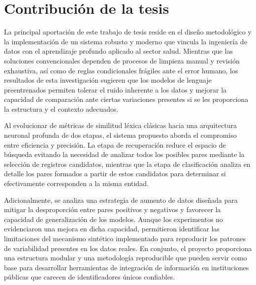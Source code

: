 \section{Contribución de la tesis}

La principal aportación de este trabajo de tesis reside en el diseño metodológico y la implementación de un sistema robusto y moderno que vincula la ingeniería de datos con el aprendizaje profundo aplicado al sector salud. Mientras que las soluciones convencionales dependen de procesos de limpieza manual y revisión exhaustiva, así como de reglas condicionales frágiles ante el error humano, los resultados de esta investigación sugieren que los modelos de lenguaje preentrenados permiten tolerar el ruido inherente a los datos y mejorar la capacidad de comparación ante ciertas variaciones presentes si se les proporciona la estructura y el contexto adecuados.

Al evolucionar de métricas de similitud léxica clásicas hacia una arquitectura neuronal profunda de dos etapas, el sistema propuesto aborda el compromiso entre eficiencia y precisión. La etapa de recuperación reduce el espacio de búsqueda evitando la necesidad de analizar todos los posibles pares mediante la selección de registros candidatos, mientras que la etapa de clasificación analiza en detalle los pares formados a partir de estos candidatos para determinar si efectivamente corresponden a la misma entidad.

Adicionalmente, se analiza una estrategia de aumento de datos diseñada para mitigar la desproporción entre pares positivos y negativos y favorecer la capacidad de generalización de los modelos. Aunque los experimentos no evidenciaron una mejora en dicha capacidad, permitieron identificar las limitaciones del mecanismo sintético implementado para reproducir los patrones de variabilidad presentes en los datos reales. En conjunto, el proyecto proporciona una estructura modular y una metodología reproducible que pueden servir como base para desarrollar herramientas de integración de información en instituciones públicas que carecen de identificadores únicos confiables.
